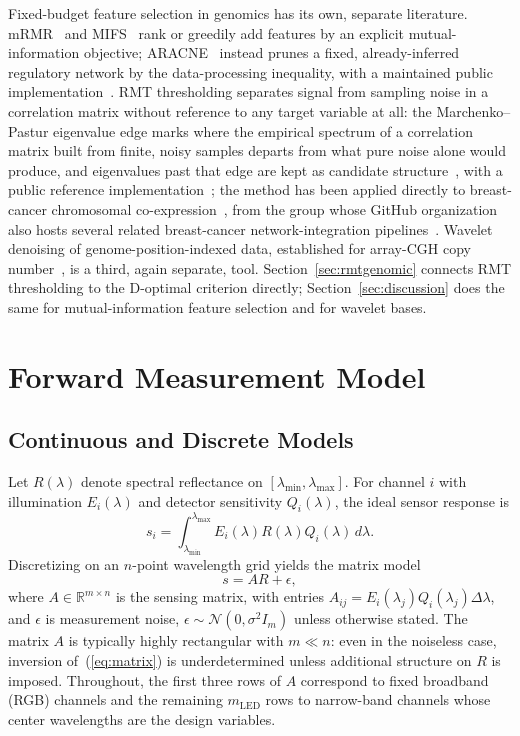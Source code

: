 \documentclass[11pt]{article}
\begin{document}
Fixed-budget feature selection in genomics has its own, separate literature. mRMR~\citep{ref41} and MIFS~\citep{ref42} rank or greedily add features by an explicit mutual-information objective; ARACNE~\citep{ref34} instead prunes a fixed, already-inferred regulatory network by the data-processing inequality, with a maintained public implementation~\citep{ref34code}. RMT thresholding separates signal from sampling noise in a correlation matrix without reference to any target variable at all: the Marchenko--Pastur eigenvalue edge marks where the empirical spectrum of a correlation matrix built from finite, noisy samples departs from what pure noise alone would produce, and eigenvalues past that edge are kept as candidate structure~\citep{ref47}, with a public reference implementation~\citep{ref47code}; the method has been applied directly to breast-cancer chromosomal co-expression~\citep{ref46}, from the group whose GitHub organization also hosts several related breast-cancer network-integration pipelines~\citep{ref46code}. Wavelet denoising of genome-position-indexed data, established for array-CGH copy number~\citep{ref48}, is a third, again separate, tool. Section~\ref{sec:rmtgenomic} connects RMT thresholding to the D-optimal criterion directly; Section~\ref{sec:discussion} does the same for mutual-information feature selection and for wavelet bases.

\section{Forward Measurement Model}
\label{sec:forward}

\subsection{Continuous and Discrete Models}

Let $R(\lambda)$ denote spectral reflectance on $[\lambda_{\min},\lambda_{\max}]$. For channel $i$ with illumination $E_i(\lambda)$ and detector sensitivity $Q_i(\lambda)$, the ideal sensor response is
\begin{equation}
s_i = \int_{\lambda_{\min}}^{\lambda_{\max}} E_i(\lambda) R(\lambda) Q_i(\lambda)\, d\lambda.
\label{eq:forward}
\end{equation}
Discretizing on an $n$-point wavelength grid yields the matrix model
\begin{equation}
s = AR + \epsilon,
\label{eq:matrix}
\end{equation}
where $A \in \mathbb{R}^{m\times n}$ is the sensing matrix, with entries $A_{ij}=E_i(\lambda_j)Q_i(\lambda_j)\Delta\lambda$, and $\epsilon$ is measurement noise, $\epsilon \sim \mathcal{N}(0,\sigma^2 I_m)$ unless otherwise stated. The matrix $A$ is typically highly rectangular with $m \ll n$: even in the noiseless case, inversion of~(\ref{eq:matrix}) is underdetermined unless additional structure on $R$ is imposed. Throughout, the first three rows of $A$ correspond to fixed broadband (RGB) channels and the remaining $m_{\mathrm{LED}}$ rows to narrow-band channels whose center wavelengths are the design variables.
\end{document}
